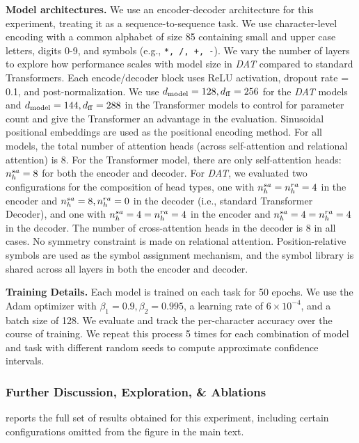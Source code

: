 
\textbf{Model architectures.} We use an encoder-decoder architecture for this experiment, treating it as a sequence-to-sequence task. We use character-level encoding with a common alphabet of size 85 containing small and upper case letters, digits 0-9, and symbols (e.g., \texttt{*, /, +, -}). We vary the number of layers to explore how performance scales with model size in \textit{DAT} compared to standard Transformers. Each encode/decoder block uses ReLU activation, dropout rate = 0.1, and post-normalization. We use $d_{\mathrm{model}} = 128, d_{\mathrm{ff}} = 256$ for the \textit{DAT} models and $d_{\mathrm{model}} = 144, d_{\mathrm{ff}} = 288$ in the Transformer models to control for parameter count and give the Transformer an advantage in the evaluation. Sinusoidal positional embeddings are used as the positional encoding method. For all models, the total number of attention heads (across self-attention and relational attention) is $8$. For the Transformer model, there are only self-attention heads: $n_h^{sa} = 8$ for both the encoder and decoder. For \textit{DAT}, we evaluated two configurations for the composition of head types, one with $n_h^{sa} = n_h^{ra} = 4$ in the encoder and $n_h^{sa} = 8, n_h^{ra} = 0$ in the decoder (i.e., standard Transformer Decoder), and one with $n_h^{sa} = 4 = n_h^{ra} = 4$ in the encoder and $n_h^{sa} = 4 = n_h^{ra} = 4$ in the decoder. The number of cross-attention heads in the decoder is $8$ in all cases. No symmetry constraint is made on relational attention. Position-relative symbols are used as the symbol assignment mechanism, and the symbol library is shared across all layers in both the encoder and decoder.

\textbf{Training Details.} Each model is trained on each task for 50 epochs. We use the Adam optimizer with $\beta_1 = 0.9, \beta_2 = 0.995$, a learning rate of $6 \times 10^{-4}$, and a batch size of 128. We evaluate and track the per-character accuracy over the course of training. We repeat this process 5 times for each combination of model and task with different random seeds to compute approximate confidence intervals.

\subsubsection*{Further Discussion, Exploration, \& Ablations}

 reports the full set of results obtained for this experiment, including certain configurations omitted from the figure in the main text.

